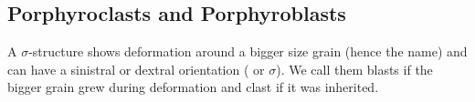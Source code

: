 \documentclass[12pt,a4paper]{report}
\begin{document}
\subsection*{Porphyroclasts and Porphyroblasts}
A $\sigma$-structure shows deformation around a bigger size grain (hence the name) and can have a sinistral or dextral orientation ( or $\sigma$).
We call them blasts if the bigger grain grew during deformation and clast if it was inherited.
\end{document}
